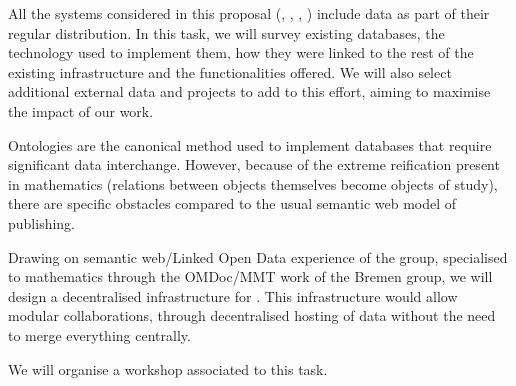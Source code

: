 \begin{workpackage}[id=dksbases,wphases=1-48!.5,
  title=Data/Knowledge/Software-Bases,lead=JU,
  ZHRM=12,JURM=36,USHRM=12,UWRM=3,SARM=10]
\begin{tasklist}
\begin{task}[title=Survey of existing databases,id=data-assessment,
  lead=ZH,partners={JU,SA,UW,US}]
  All the systems considered in this proposal (\GAP, \Sage, \Pari, \Singular) include data
  as part of their regular distribution. In this task, we will survey existing databases,
  the technology used to implement them, how they were linked to the rest of the existing
  infrastructure and the functionalities offered. We will also select additional external
  data and projects to add to this effort, aiming to maximise the impact of our work.
\end{task}

\begin{task}[id=data-design,lead=JU,partners={ZH,US,SA,UW},
  title={Formulation of requirements and design of new  infrastructure when appropriate}]

  Ontologies are the canonical method used to implement databases that require significant
  data interchange. However, because of the extreme reification present in mathematics
  (relations between objects themselves become objects of study), there are specific
  obstacles compared to the usual semantic web model of publishing.

  Drawing on semantic web/Linked Open Data experience of the  group, specialised to
  mathematics through the OMDoc/MMT work of the Bremen group, we will design a
  decentralised infrastructure for \TheProject. This infrastructure would allow modular
  collaborations, through decentralised hosting of data without the need to merge
  everything centrally.

  We will organise a workshop associated to this task.





\end{task}
\end{tasklist}
\end{workpackage}
